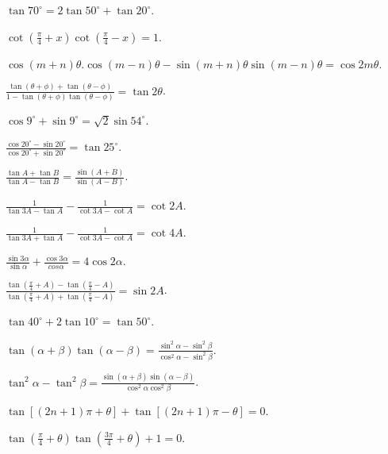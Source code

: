 \item $\tan 70^\circ = 2\tan 50^\circ + \tan 20^\circ$.

\item $\cot\left(\frac{\pi}{4} + x\right)\cot\left(\frac{\pi}{4} - x\right) = 1$.

\item $\cos(m + n)\theta.\cos(m - n)\theta - \sin(m + n)\theta\sin(m - n)\theta = \cos 2m\theta$.

\item $\frac{\tan(\theta + \phi) + \tan(\theta - \phi)}{1 - \tan(\theta + \phi)\tan(\theta - \phi)} = \tan 2\theta$.

\item $\cos 9^\circ + \sin 9^\circ = \sqrt{2}\sin 54^\circ$.

\item $\frac{\cos 20^\circ - \sin 20^\circ}{\cos 20^\circ + \sin 20^\circ} = \tan 25^\circ$.

\item $\frac{\tan A + \tan B}{\tan A - \tan B} = \frac{\sin(A + B)}{\sin(A - B)}$.

\item $\frac{1}{\tan 3A - \tan A} - \frac{1}{\cot 3A - \cot A} = \cot 2A$.

\item $\frac{1}{\tan 3A + \tan A} - \frac{1}{\cot 3A - \cot A} = \cot 4A$.

\item $\frac{\sin 3\alpha}{\sin\alpha} + \frac{\cos 3\alpha}{cos\alpha} = 4\cos 2\alpha$.

\item $\frac{\tan\left(\frac{\pi}{4} + A \right) - \tan\left(\frac{\pi}{4} - A\right)}{\tan\left(\frac{\pi}{4} + A\right) +
    \tan\left(\frac{\pi}{4} - A\right)} = \sin 2A$.

\item $\tan 40^\circ + 2 \tan 10^\circ = \tan 50^\circ$.

\item $\tan(\alpha + \beta)\tan(\alpha - \beta) = \frac{\sin^2\alpha - \sin^2\beta}{\cos^2\alpha - \sin^2\beta}$.

\item $\tan^2\alpha -\tan^2\beta = \frac{\sin(\alpha + \beta)\sin(\alpha - \beta)}{\cos^2\alpha\cos^2\beta}$.

\item $\tan[(2n + 1)\pi + \theta] + \tan[(2n + 1)\pi - \theta] = 0$.

\item $\tan\left(\frac{\pi}{4} + \theta\right)\tan\left(\frac{3\pi}{4} + \theta\right) + 1 = 0$.


